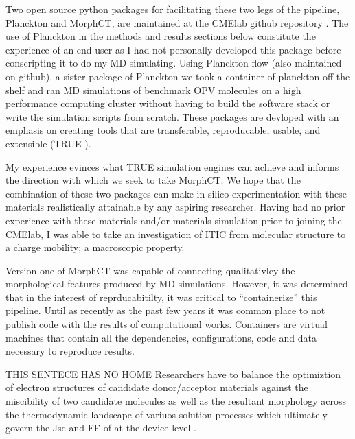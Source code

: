 
Two open source python packages for
facilitating these two legs of the pipeline, Planckton and MorphCT, are maintained at 
the CMElab github repository \cite{cmelab}.
The use of Planckton in the methods and results sections below
constitute the experience of an end user as I had not personally developed this package before conscripting it
to do my MD simulating. Using Planckton-flow (also maintained on github), a sister package
of Planckton we took a container of planckton off the shelf and ran MD simulations of benchmark OPV
molecules on a high performance computing cluster without having to build the software stack or write the
simulation scripts from scratch. These packages are devloped with an emphasis on creating tools that are
transferable, reproducable, usable, and extensible (TRUE \cite{Cummings2017}).

My experience evinces what TRUE simulation engines can achieve and
informs the direction with which we seek to take MorphCT. We hope that the combination of these two packages
can make in silico experimentation with these materials realistically attainable by any aspiring researcher.
Having had no prior experience with these materials and/or materials simulation prior to joining the CMElab,
I was able to take an investigation of ITIC from molecular
structure to a charge mobility; a macroscopic property. 

Version one of MorphCT was capable of
connecting qualitativley the morphological features produced by MD simulations. However, it was determined
that in the interest of reprducabitilty, it was critical to ``containerize'' this pipeline. Until as recently as
the past few years it was common place to not publish code with the results of computational works. Containers
are virtual machines that contain all the dependencies, configurations, code and data necessary to reproduce
results. \cite{Cito2016a}

THIS SENTECE HAS NO HOME Researchers have to
balance the optimiztion of electron structures of candidate donor/acceptor materials against the miscibility
of two candidate molecules as well as the resultant morphology across the thermodynamic landscape of
variuos solution processes which ultimately govern the Jsc and FF of at the device level \cite{Zhu2020a}. 
